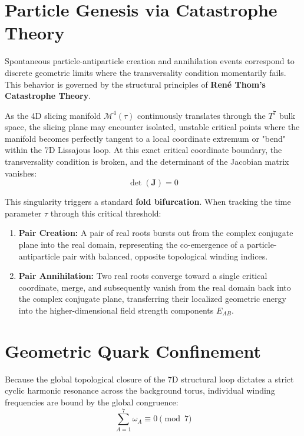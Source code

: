 \documentclass[12pt,letterpaper]{article}
\theoremstyle{definition}
\begin{document}
\section{Particle Genesis via Catastrophe Theory}
Spontaneous particle-antiparticle creation and annihilation events correspond to discrete geometric limits where the transversality condition momentarily fails. This behavior is governed by the structural principles of \textbf{René Thom's Catastrophe Theory}.

As the 4D slicing manifold $\mathcal{M}^4(\tau)$ continuously translates through the $T^7$ bulk space, the slicing plane may encounter isolated, unstable critical points where the manifold becomes perfectly tangent to a local coordinate extremum or "bend" within the 7D Lissajous loop. At this exact critical coordinate boundary, the transversality condition is broken, and the determinant of the Jacobian matrix vanishes:
\begin{equation}
    \det(\mathbf{J}) = 0
\end{equation}

This singularity triggers a standard \textbf{fold bifurcation}. When tracking the time parameter $\tau$ through this critical threshold:
\begin{enumerate}
    \item \textbf{Pair Creation:} A pair of real roots bursts out from the complex conjugate plane into the real domain, representing the co-emergence of a particle-antiparticle pair with balanced, opposite topological winding indices.
    \item \textbf{Pair Annihilation:} Two real roots converge toward a single critical coordinate, merge, and subsequently vanish from the real domain back into the complex conjugate plane, transferring their localized geometric energy into the higher-dimensional field strength components $E_{AB}$.
\end{enumerate}

\section{Geometric Quark Confinement}
Because the global topological closure of the 7D structural loop dictates a strict cyclic harmonic resonance across the background torus, individual winding frequencies are bound by the global congruence:
\begin{equation}
    \sum_{A=1}^7 \omega_A \equiv 0 \pmod 7
\end{equation}
\end{document}
